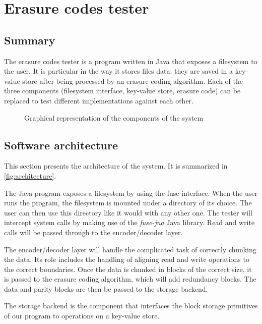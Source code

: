 \chapter{Erasure codes tester}

\section{Summary}

The erasure codes tester is a program written in Java that exposes a filesystem to the user.
It is particular in the way it stores files data: they are saved in a key-value store after being processed by an erasure coding algorithm.
Each of the three components (filesystem interface, key-value store, erasure code) can be replaced to test different implementations against each other.

\begin{figure}
	\centering
	
	\caption{Graphical representation of the components of the system}
	\label{fig:architecture}
\end{figure}

\section{Software architecture}
\label{subsec:architecture}

This section presents the architecture of the system.
It is summarized in \autoref{fig:architecture}.

The Java program exposes a filesystem by using the \ac{fuse} interface.
When the user runs the program, the filesystem is mounted under a directory of its choice.
The user can then use this directory like it would with any other one.
The tester will intercept system calls by making use of the \textit{fuse-jna} \autocite{fuse-jna} Java library.
Read and write calls will be passed through to the encoder/decoder layer.

The encoder/decoder layer will handle the complicated task of correctly chunking the data.
Its role includes the handling of aligning read and write operations to the correct boundaries.
Once the data is chunked in blocks of the correct size, it is passed to the erasure coding algorithm, which will add redundancy blocks.
The data and parity blocks are then be passed to the storage backend.

The storage backend is the component that interfaces the block storage primitives of our program to operations on a key-value store.

